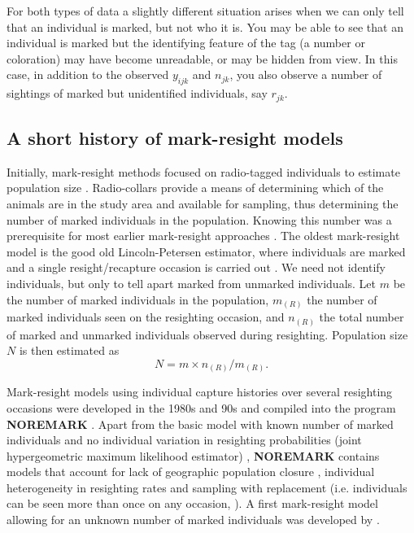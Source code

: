 For both types of data a slightly different situation arises when
we can only tell that an individual is marked, but not
who it is. You may be able to see that an individual is marked but the
identifying feature of the tag (a number or coloration) may have
become unreadable, or may be hidden from view. In this case, in
addition to the observed $y_{ijk}$ and $n_{jk}$, you also observe a number of
sightings of marked but unidentified individuals, say $r_{jk}$.

\subsection{A short history of mark-resight models}

Initially, mark-resight methods focused on radio-tagged individuals to
estimate population size \citep{white_shenk:2001}. Radio-collars
provide a means of determining which of the animals are in the study
area and available for sampling, thus determining the number of marked
individuals in the population. Knowing this number was a prerequisite
for most earlier mark-resight approaches \citep{white:1996}. The
oldest mark-resight model is the good old Lincoln-Petersen estimator,
where individuals are marked and a single resight/recapture occasion
is carried out \citep{krebs:1999}. We need not identify individuals,
but only to tell apart marked from unmarked individuals. Let $m$ be
the number of marked individuals in the population, $m_{(R)}$ the
number of marked individuals seen on the resighting occasion, and
$n_{(R)}$ the total number of marked and unmarked individuals observed
during resighting. Population size $N$ is then estimated as
\[
N = m \times n_{(R)}/m_{(R)}.
\]

Mark-resight models using individual capture histories
over several resighting occasions were developed in the 1980s and
90s and compiled into the program \textbf{NOREMARK} \citep{white:1996}. Apart
from the basic model with known number of marked individuals and no
individual variation in resighting probabilities (joint hypergeometric
maximum likelihood estimator) \citep{bartmann_etal:1987,
  white_garrot:1990, neal:1990, neal_etal:1993}, \textbf{NOREMARK} contains
models that account for lack of geographic population closure
\citep{neal_etal:1993}, individual heterogeneity in resighting rates
and sampling with replacement (i.e. individuals can be seen more than
once on any occasion, \citep{minta_mangel:1989, bowden:1993}). A first
mark-resight model allowing for an unknown number of marked
individuals was developed by \citet{arnason_etal:1991}.

